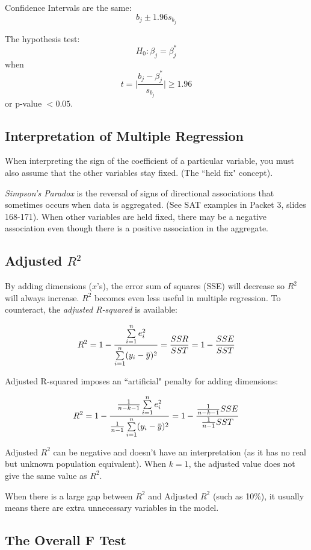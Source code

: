 \documentclass[11pt, oneside]{article}   	%
\newcommand{\overbar}[1]{\mkern 1.5mu\overline{\mkern-1.5mu#1\mkern-1.5mu}\mkern 1.5mu}
\begin{document}
Confidence Intervals are the same:
\[
b_j \pm 1.96 s_{b_j}
\]

The hypothesis test:
\[
H_0 : \beta_j = \beta_j^*
\]
when 
\[
t = \Bigg\lvert \frac{b_j - \beta_j^*} { s_{b_j} } \Bigg\lvert \geq 1.96
\]
 or p-value $< 0.05$.

\subsection{Interpretation of Multiple Regression}

When interpreting the sign of the coefficient of a particular variable, you must also assume that the other variables stay fixed. (The ``held fix" concept).

\textit{Simpson's Paradox} is the reversal of signs of directional associations that sometimes occurs when data is aggregated. (See SAT examples in Packet 3, slides 168-171). When other variables are held fixed, there may be a negative association even though there is a positive association in the aggregate.

\subsection{Adjusted $R^2$}

By adding dimensions ($x$'s), the error sum of squares (SSE) will decrease so $R^2$ will always increase. $R^2$ becomes even less useful in multiple regression. To counteract, the \textit{adjusted R-squared} is available:

\[
R^2 = 1 - \frac{ \sum\limits_{i=1}^n e^2_i} {\sum\limits_{i=1}^n (y_i - \overbar{y})^2} = \frac{SSR}{SST} =  1 - \frac{SSE}{SST}
\]

Adjusted R-squared imposes an ``artificial" penalty for adding dimensions:

\[
R^2 = 1 - \frac{ \frac{1}{n-k-1} \sum\limits_{i=1}^n e^2_i} {\frac{1}{n-1} \sum\limits_{i=1}^n (y_i - \overbar{y})^2}  =  1 - \frac{ \frac{1}{n-k-1}SSE}{\frac{1}{n-1}SST}
\]

Adjusted $R^2$ can be negative and doesn't have an interpretation (as it has no real but unknown population equivalent).  When $k=1$, the adjusted value does not give the same value as $R^2$.

When there is a large gap between $R^2$ and Adjusted $R^2$ (such as 10\%), it usually means there are extra unnecessary variables in the model.

\subsection{The Overall F Test}
\end{document}
